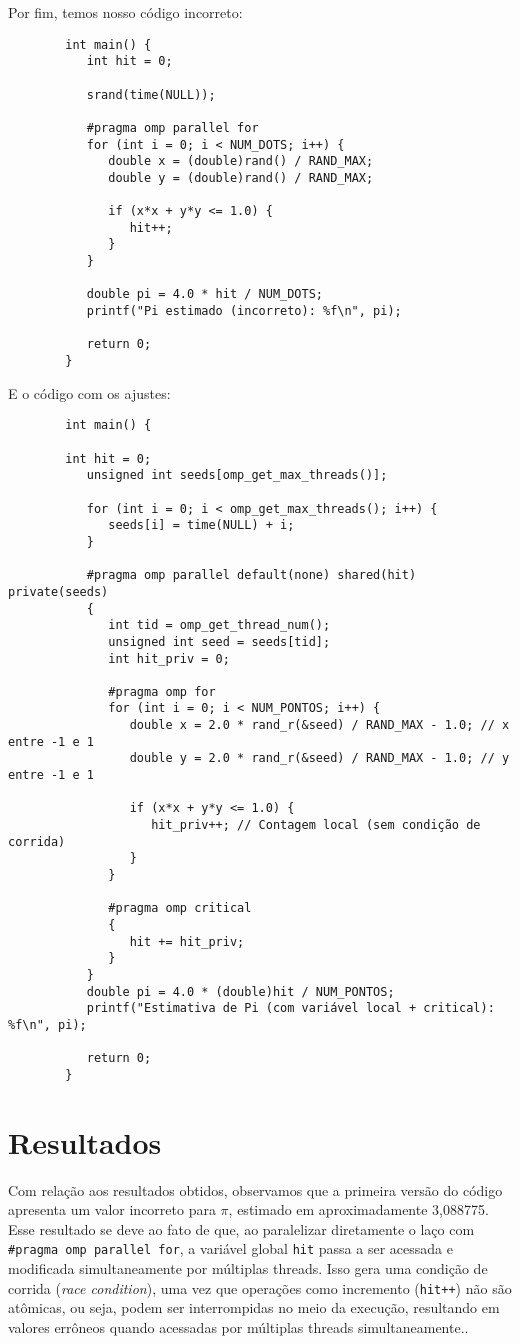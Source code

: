 \documentclass[a4paper, 12pt]{article}
\begin{document}
	Por fim, temos nosso código incorreto: 
	
	\begin{verbatim}
		int main() {
		   int hit = 0;
			
		   srand(time(NULL));
		
		   #pragma omp parallel for
		   for (int i = 0; i < NUM_DOTS; i++) {
		      double x = (double)rand() / RAND_MAX;
		      double y = (double)rand() / RAND_MAX;
				
		      if (x*x + y*y <= 1.0) {
		         hit++;
		      }
		   }
			
		   double pi = 4.0 * hit / NUM_DOTS;
		   printf("Pi estimado (incorreto): %f\n", pi);
			
		   return 0;
		}
	\end{verbatim}
	
	E o código com os ajustes:
	
	\begin{verbatim}
		int main() {
		
		int hit = 0;
		   unsigned int seeds[omp_get_max_threads()];
		
		   for (int i = 0; i < omp_get_max_threads(); i++) {
		      seeds[i] = time(NULL) + i;
		   }
		
		   #pragma omp parallel default(none) shared(hit) private(seeds)
		   {
		      int tid = omp_get_thread_num();
		      unsigned int seed = seeds[tid];
		      int hit_priv = 0;
		
		      #pragma omp for
		      for (int i = 0; i < NUM_PONTOS; i++) {
		         double x = 2.0 * rand_r(&seed) / RAND_MAX - 1.0; // x entre -1 e 1
		         double y = 2.0 * rand_r(&seed) / RAND_MAX - 1.0; // y entre -1 e 1
		
		         if (x*x + y*y <= 1.0) {
		            hit_priv++; // Contagem local (sem condição de corrida)
		         }
		      }
		      
		      #pragma omp critical
		      {
		         hit += hit_priv;
		      }
		   }
		   double pi = 4.0 * (double)hit / NUM_PONTOS;
		   printf("Estimativa de Pi (com variável local + critical): %f\n", pi);
		
		   return 0;
		}
	\end{verbatim}
	
	\section{Resultados}
	\hspace{0.5cm}Com relação aos resultados obtidos, observamos que a primeira versão do código apresenta um valor incorreto para $\pi$, estimado em aproximadamente 3{,}088775. Esse resultado se deve ao fato de que, ao paralelizar diretamente o laço com \texttt{\#pragma omp parallel for}, a variável global \texttt{hit} passa a ser acessada e modificada simultaneamente por múltiplas threads. Isso gera uma condição de corrida (\textit{race condition}), uma vez que operações como incremento (\texttt{hit++}) não são atômicas, ou seja, podem ser interrompidas no meio da execução, resultando em valores errôneos quando acessadas por múltiplas threads simultaneamente..
	
\end{document}

